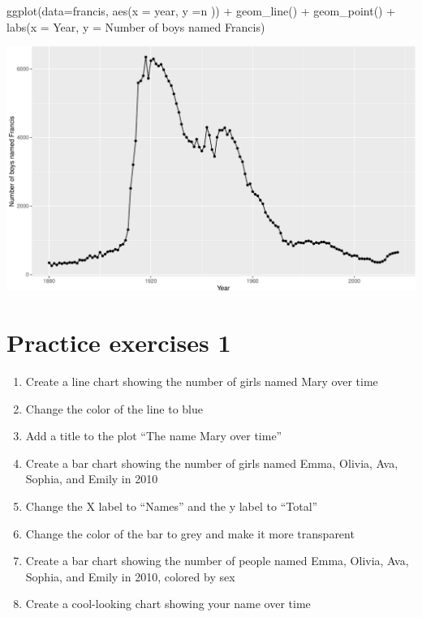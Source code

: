 \documentclass[
]{book}
\newenvironment{Shaded}{\begin{snugshade}}{\end{snugshade}}
\newcommand{\AttributeTok}[1]{\textcolor[rgb]{0.77,0.63,0.00}{#1}}
\newcommand{\FunctionTok}[1]{\textcolor[rgb]{0.00,0.00,0.00}{#1}}
\newcommand{\NormalTok}[1]{#1}
\newcommand{\SpecialCharTok}[1]{\textcolor[rgb]{0.00,0.00,0.00}{#1}}
\newcommand{\StringTok}[1]{\textcolor[rgb]{0.31,0.60,0.02}{#1}}
\begin{document}
\begin{Shaded}
\begin{Highlighting}[]

\FunctionTok{ggplot}\NormalTok{(}\AttributeTok{data=}\NormalTok{francis, }\FunctionTok{aes}\NormalTok{(}\AttributeTok{x =}\NormalTok{ year, }\AttributeTok{y =}\NormalTok{n )) }\SpecialCharTok{+} \FunctionTok{geom\_line}\NormalTok{() }\SpecialCharTok{+} \FunctionTok{geom\_point}\NormalTok{() }\SpecialCharTok{+} \FunctionTok{labs}\NormalTok{(}\AttributeTok{x =} \StringTok{\textquotesingle{}Year\textquotesingle{}}\NormalTok{, }\AttributeTok{y =} \StringTok{\textquotesingle{}Number of boys named Francis\textquotesingle{}}\NormalTok{)}
\end{Highlighting}
\end{Shaded}

\includegraphics{figures/unnamed-chunk-148-3.pdf}

\hypertarget{practice-exercises-1}{%
\section*{Practice exercises 1}\label{practice-exercises-1}}

\begin{enumerate}
\def\labelenumi{\arabic{enumi})}
\item
  Create a line chart showing the number of girls named Mary over time
\item
  Change the color of the line to blue
\item
  Add a title to the plot ``The name Mary over time''
\item
  Create a bar chart showing the number of girls named Emma, Olivia, Ava, Sophia, and Emily in 2010
\item
  Change the X label to ``Names'' and the y label to ``Total''
\item
  Change the color of the bar to grey and make it more transparent
\item
  Create a bar chart showing the number of people named Emma, Olivia, Ava, Sophia, and Emily in 2010, colored by sex
\item
  Create a cool-looking chart showing your name over time
\end{enumerate}
\end{document}
